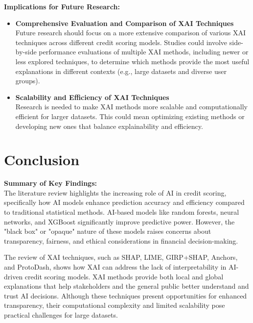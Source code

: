 \documentclass[12pt,a4paper]{article}
\begin{document}
\newpage
\textbf{Implications for Future Research:}\\
\begin{itemize}
    \vspace{-3em}
    \item \textbf{Comprehensive Evaluation and Comparison of XAI Techniques}\\
    Future research should focus on a more extensive comparison of various XAI techniques across different credit scoring models. Studies could involve side-by-side performance evaluations of multiple XAI methods, including newer or less explored techniques, to determine which methods provide the most useful explanations in different contexts (e.g., large datasets and diverse user groups).
    \item \textbf{Scalability and Efficiency of XAI Techniques}\\
    Research is needed to make XAI methods more scalable and computationally efficient for larger datasets. This could mean optimizing existing methods or developing new ones that balance explainability and efficiency.
\end{itemize}


\section{Conclusion}
\vspace{-1em}
\textbf{Summary of Key Findings:}\\
The literature review highlights the increasing role of AI in credit scoring, specifically how AI models enhance prediction accuracy and efficiency compared to traditional statistical methods. AI-based models like random forests, neural networks, and XGBoost significantly improve predictive power. However, the "black box" or "opaque" nature of these models raises concerns about transparency, fairness, and ethical considerations in financial decision-making.

The review of  XAI techniques, such as SHAP, LIME, GIRP+SHAP, Anchors, and ProtoDash, shows how XAI can address the lack of interpretability in AI-driven credit scoring models. XAI methods provide both local and global explanations that help stakeholders and the general public better understand and trust AI decisions. Although these techniques present opportunities for enhanced transparency, their computational complexity and limited scalability pose practical challenges for large datasets.
\end{document}
